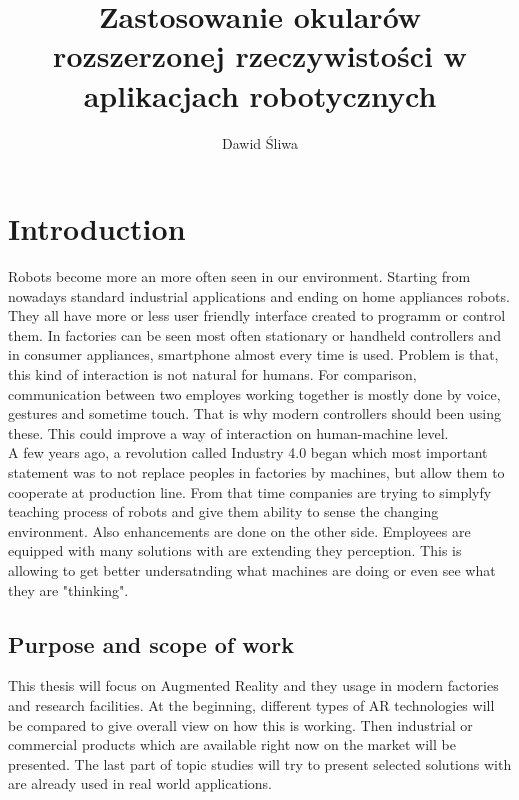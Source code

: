 \documentclass[printmode,en]{mgr}
\title{Zastosowanie okularów rozszerzonej rzeczywistości w aplikacjach
robotycznych}
\author{Dawid Śliwa}
\begin{document}

\maketitle %


\tableofcontents %

\chapter{Introduction}
Robots become more an more often seen in our environment. Starting from nowadays standard industrial applications and ending on home appliances robots. They all have more or less user friendly interface created to programm or control them. In factories can be seen most often stationary or handheld controllers and in consumer appliances, smartphone almost every time is used. Problem is that, this kind of interaction is not natural for humans. For comparison, communication between two employes working together is mostly done by voice, gestures and sometime touch. That is why modern controllers should been using these. This could improve a way of interaction on human-machine level. \\

A few years ago, a revolution called Industry 4.0 began which most important statement was to not replace peoples in factories by machines, but allow them to cooperate at production line. From that time companies are trying to simplyfy teaching process of robots and give them ability to sense the changing environment. Also enhancements are done on the other side. Employees are equipped with many solutions with are extending they perception. This is allowing to get better undersatnding what machines are doing or even see what they are "thinking".

\section{Purpose and scope of work}
This thesis will focus on Augmented Reality and they usage in modern factories and research facilities. At the beginning, different types of AR technologies will be compared to give overall view on how this is working. Then industrial or commercial products which are available right now on the market will be presented. The last part of topic studies will try to present selected solutions with are already used in real world applications.\\
\end{document}
